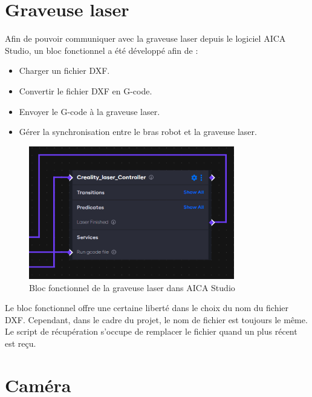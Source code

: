 \section{Graveuse laser}
Afin de pouvoir communiquer avec la graveuse laser depuis le logiciel AICA Studio, un bloc fonctionnel a été développé afin de :
\begin{itemize}
    \item Charger un fichier DXF.
    \item Convertir le fichier DXF en G-code.
    \item Envoyer le G-code à la graveuse laser.
    \item Gérer la synchronisation entre le bras robot et la graveuse laser.
\end{itemize}

\begin{figure}[H]
    \centering
    \includegraphics[width=0.8\textwidth]{assets/figures/AICA_Laser_interface.png}
    \caption{Bloc fonctionnel de la graveuse laser dans AICA Studio}
    \label{fig:laser_interface}
\end{figure}

Le bloc fonctionnel offre une certaine liberté dans le choix du nom du fichier DXF. Cependant, dans le cadre du projet, le nom de fichier est toujours le même. Le script de récupération s'occupe de remplacer le fichier quand un plus récent est reçu.

\section{Caméra}

